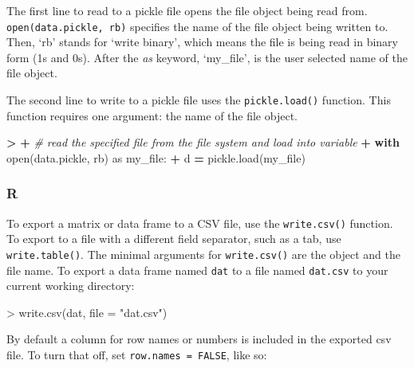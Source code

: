 \documentclass[
]{book}
\newenvironment{Shaded}{\begin{snugshade}}{\end{snugshade}}
\newcommand{\AttributeTok}[1]{\textcolor[rgb]{0.77,0.63,0.00}{#1}}
\newcommand{\BuiltInTok}[1]{#1}
\newcommand{\CommentTok}[1]{\textcolor[rgb]{0.56,0.35,0.01}{\textit{#1}}}
\newcommand{\ControlFlowTok}[1]{\textcolor[rgb]{0.13,0.29,0.53}{\textbf{#1}}}
\newcommand{\FunctionTok}[1]{\textcolor[rgb]{0.00,0.00,0.00}{#1}}
\newcommand{\ImportTok}[1]{#1}
\newcommand{\NormalTok}[1]{#1}
\newcommand{\OperatorTok}[1]{\textcolor[rgb]{0.81,0.36,0.00}{\textbf{#1}}}
\newcommand{\SpecialCharTok}[1]{\textcolor[rgb]{0.00,0.00,0.00}{#1}}
\newcommand{\StringTok}[1]{\textcolor[rgb]{0.31,0.60,0.02}{#1}}
\begin{document}
The first line to read to a pickle file opens the file object being read from. \texttt{open(\textquotesingle{}data.pickle\textquotesingle{},\ \textquotesingle{}rb\textquotesingle{})} specifies the name of the file object being written to. Then, `rb' stands for `write binary', which means the file is being read in binary form (1s and 0s). After the \emph{as} keyword, `my\_file', is the user selected name of the file object.

The second line to write to a pickle file uses the \texttt{pickle.load()} function. This function requires one argument: the name of the file object.

\begin{Shaded}
\begin{Highlighting}[]
\OperatorTok{\textgreater{}} 
\OperatorTok{+} \CommentTok{\# read the specified file from the file system and load into variable}
\OperatorTok{+} \ControlFlowTok{with} \BuiltInTok{open}\NormalTok{(}\StringTok{\textquotesingle{}data.pickle\textquotesingle{}}\NormalTok{, }\StringTok{\textquotesingle{}rb\textquotesingle{}}\NormalTok{) }\ImportTok{as}\NormalTok{ my\_file:}
\OperatorTok{+}\NormalTok{     d }\OperatorTok{=}\NormalTok{ pickle.load(my\_file)}
\end{Highlighting}
\end{Shaded}

\hypertarget{r-16}{%
\subsubsection*{R}\label{r-16}}

To export a matrix or data frame to a CSV file, use the \texttt{write.csv()} function. To export to a file with a different field separator, such as a tab, use \texttt{write.table()}. The minimal arguments for \texttt{write.csv()} are the object and the file name. To export a data frame named \texttt{dat} to a file named \texttt{dat.csv} to your current working directory:

\begin{Shaded}
\begin{Highlighting}[]
\SpecialCharTok{\textgreater{}} \FunctionTok{write.csv}\NormalTok{(dat, }\AttributeTok{file =} \StringTok{"dat.csv"}\NormalTok{)}
\end{Highlighting}
\end{Shaded}

By default a column for row names or numbers is included in the exported csv file. To turn that off, set \texttt{row.names\ =\ FALSE}, like so:
\end{document}
